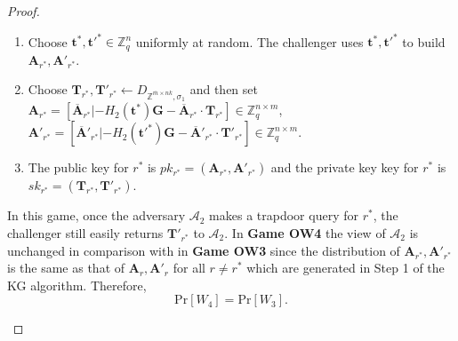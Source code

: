 \documentclass[a4paper,11pt,onecolumn]{elsarticle}
\def\Pr{\mathrm{Pr}}
\begin{document}
\begin{proof}
\begin{description}
\begin{enumerate}
		 \item Choose $\textbf{t}^*, \textbf{t}'^*\in \mathbb{Z}_q^n$ uniformly at random. The challenger uses  $\textbf{t}^*, \textbf{t}'^*$  to build $\mathbf{A}_{r^*}, \mathbf{A}'_{r^*}$.
		\item  Choose $ \mathbf{T}_{r^*}, \mathbf{T}'_{r^*} \leftarrow D_{\mathbb{Z}^{\overline{m} \times n k }, \sigma_1} $ and then set $\mathbf{A}_{r^*}=[\overline{\mathbf{A}}_{r^*}|-H_2(\textbf{t}^*)\mathbf{G}-\overline{\mathbf{A}}_{r^*}\cdot \mathbf{T}_{r^*}] \in \mathbb{Z}_q^{n \times m}$, $\mathbf{A}'_{r^*}=[\overline{\mathbf{A}}'_{r^*}|-H_2(\textbf{t}'^*)\mathbf{G}-\overline{\mathbf{A}}'_{r^*}\cdot \mathbf{T}'_{r^*}] \in \mathbb{Z}_q^{n \times m}$.
		\item The public key for $r^*$ is $pk_{r^*}=(\mathbf{A}_{r^*},\mathbf{A}'_{r^*})$ and the private key key for $r^*$ is $sk_{r^*}=(\mathbf{T}_{r^*},\mathbf{T}'_{r^*})$.
					  		 	  	\end{enumerate}	
					  		 	  	
					  		 	  	
		\item In this game, once the adversary $\mathcal{A}_2$ makes a trapdoor query for $r^*$, the challenger still easily returns $\textbf{T}'_{r^*}$ to $\mathcal{A}_2$. In  \textbf{Game OW4}  the view of $\mathcal{A}_2$ is unchanged in comparison with in \textbf{Game OW3} since the distribution of  $\mathbf{A}_{r^*}, \mathbf{A}'_{r^*}$ is the same as that of $\mathbf{A}_{r}, \mathbf{A}'_{r}$ for all $r \neq r^*$ which are generated in Step 1 of the \textsf{KG} algorithm.  Therefore,
		$$\Pr[W_4]=\Pr[W_3].$$
		
					 
		

\end{description}
\end{proof}
\end{document}
